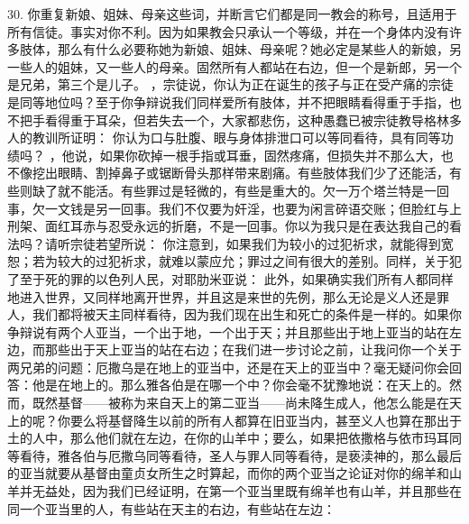 30. 你重复新娘、姐妹、母亲这些词，并断言它们都是同一教会的称号，且适用于所有信徒。事实对你不利。因为如果教会只承认一个等级，并在一个身体内没有许多肢体，那么有什么必要称她为新娘、姐妹、母亲呢？她必定是某些人的新娘，另一些人的姐妹，又一些人的母亲。固然所有人都站在右边，但一个是新郎，另一个是兄弟，第三个是儿子。 ，宗徒说，你认为正在诞生的孩子与正在受产痛的宗徒是同等地位吗？至于你争辩说我们同样爱所有肢体，并不把眼睛看得重于手指，也不把手看得重于耳朵，但若失去一个，大家都悲伤，这种愚蠢已被宗徒教导格林多人的教训所证明： 你认为口与肚腹、眼与身体排泄口可以等同看待，具有同等功绩吗？ ，他说，如果你砍掉一根手指或耳垂，固然疼痛，但损失并不那么大，也不像挖出眼睛、割掉鼻子或锯断骨头那样带来剧痛。有些肢体我们少了还能活，有些则缺了就不能活。有些罪过是轻微的，有些是重大的。欠一万个塔兰特是一回事，欠一文钱是另一回事。我们不仅要为奸淫，也要为闲言碎语交账；但脸红与上刑架、面红耳赤与忍受永远的折磨，不是一回事。你以为我只是在表达我自己的看法吗？请听宗徒若望所说： 你注意到，如果我们为较小的过犯祈求，就能得到宽恕；若为较大的过犯祈求，就难以蒙应允；罪过之间有很大的差别。同样，关于犯了至于死的罪的以色列人民，对耶肋米亚说： 此外，如果确实我们所有人都同样地进入世界，又同样地离开世界，并且这是来世的先例，那么无论是义人还是罪人，我们都将被天主同样看待，因为我们现在出生和死亡的条件是一样的。如果你争辩说有两个人亚当，一个出于地，一个出于天；并且那些出于地上亚当的站在左边，而那些出于天上亚当的站在右边；在我们进一步讨论之前，让我问你一个关于两兄弟的问题：厄撒乌是在地上的亚当中，还是在天上的亚当中？毫无疑问你会回答：他是在地上的。那么雅各伯是在哪一个中？你会毫不犹豫地说：在天上的。然而，既然基督——被称为来自天上的第二亚当——尚未降生成人，他怎么能是在天上的呢？你要么将基督降生以前的所有人都算在旧亚当内，甚至义人也算在那出于土的人中，那么他们就在左边，在你的山羊中；要么，如果把依撒格与依市玛耳同等看待，雅各伯与厄撒乌同等看待，圣人与罪人同等看待，是亵渎神的，那么最后的亚当就要从基督由童贞女所生之时算起，而你的两个亚当之论证对你的绵羊和山羊并无益处，因为我们已经证明，在第一个亚当里既有绵羊也有山羊，并且那些在同一个亚当里的人，有些站在天主的右边，有些站在左边： \par

